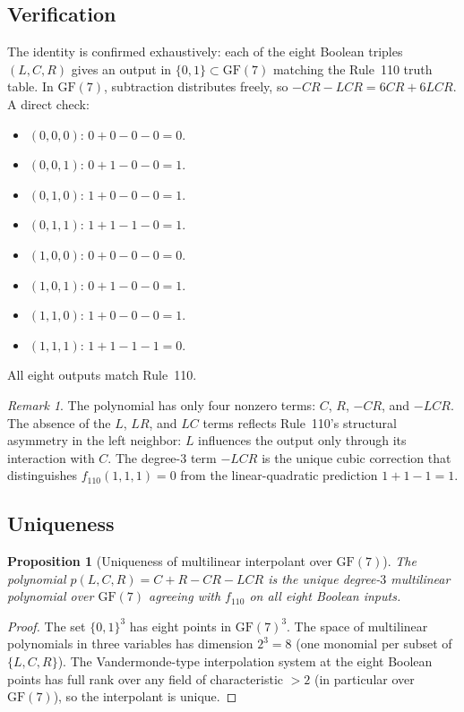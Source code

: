 \documentclass[11pt]{article}
\newtheorem{proposition}[theorem]{Proposition}
\theoremstyle{remark}
\newtheorem{remark}[theorem]{Remark}
\begin{document}
\subsection{Verification}

The identity is confirmed exhaustively: each of the eight Boolean triples
$(L,C,R)$ gives an output in $\{0,1\} \subset \mathrm{GF}(7)$ matching
the Rule~110 truth table.
In $\mathrm{GF}(7)$, subtraction distributes freely, so $-CR - LCR = 6CR + 6LCR$.
A direct check:
\begin{itemize}[itemsep=0.1em]
  \item $(0,0,0)$: $0+0-0-0=0$. \checkmark
  \item $(0,0,1)$: $0+1-0-0=1$. \checkmark
  \item $(0,1,0)$: $1+0-0-0=1$. \checkmark
  \item $(0,1,1)$: $1+1-1-0=1$. \checkmark
  \item $(1,0,0)$: $0+0-0-0=0$. \checkmark
  \item $(1,0,1)$: $0+1-0-0=1$. \checkmark
  \item $(1,1,0)$: $1+0-0-0=1$. \checkmark
  \item $(1,1,1)$: $1+1-1-1=0$. \checkmark
\end{itemize}
All eight outputs match Rule~110.

\begin{remark}
The polynomial has only four nonzero terms: $C$, $R$, $-CR$, and $-LCR$.
The absence of the $L$, $LR$, and $LC$ terms reflects Rule~110's structural asymmetry
in the left neighbor: $L$ influences the output only through its interaction with $C$.
The degree-3 term $-LCR$ is the unique cubic correction that distinguishes
$f_{110}(1,1,1) = 0$ from the linear-quadratic prediction $1+1-1=1$.
\end{remark}

\subsection{Uniqueness}

\begin{proposition}[Uniqueness of multilinear interpolant over $\mathrm{GF}(7)$]
\label{prop:unique}
The polynomial $p(L,C,R) = C + R - CR - LCR$ is the unique degree-$3$ multilinear
polynomial over $\mathrm{GF}(7)$ agreeing with $f_{110}$ on all eight Boolean inputs.
\end{proposition}

\begin{proof}
The set $\{0,1\}^3$ has eight points in $\mathrm{GF}(7)^3$.
The space of multilinear polynomials in three variables has dimension $2^3 = 8$
(one monomial per subset of $\{L,C,R\}$).
The Vandermonde-type interpolation system at the eight Boolean points has full rank over
any field of characteristic $> 2$ (in particular over $\mathrm{GF}(7)$), so the
interpolant is unique.
\end{proof}
\end{document}
